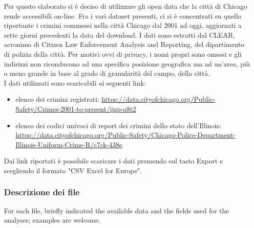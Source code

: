 \documentclass[10pt]{article}
\begin{document}
Per questo elaborato si è deciso di utilizzare gli open data che la città di Chicago rende accessibili on-line. 
Fra i vari dataset presenti, ci si è concentrati su quello riportante i crimini commessi nella città Chicago dal 2001 ad oggi, aggiornati 
a sette giorni precedenti la data del download. I dati sono estratti dal CLEAR, acronimo di Citizen Law Enforcement Analysis and Reporting, 
del dipartimento di polizia della città. Per motivi ovvi di privacy, i nomi propri sono omessi e gli indirizzi non riconducono 
ad una specifica posizione geografica ma ad un'area, più o meno grande in base al grado di granularità del campo, della città. \\
I dati utilizzati sono scaricabili ai seguenti link:
\begin{itemize}
\item elenco dei crimini registrati: \url{https://data.cityofchicago.org/Public-Safety/Crimes-2001-to-present/ijzp-q8t2}
\item elenco dei codici univoci di report dei crimini dello stato dell'Illinois: \url{https://data.cityofchicago.org/Public-Safety/Chicago-Police-Department-Illinois-Uniform-Crime-R/c7ck-438e} 
\end{itemize}
Dai link riportati è possibile scaricare i dati premendo sul tasto Export e scegliendo il formato "CSV Excel for Europe".
 
\subsubsection{Descrizione dei file}

For each file, briefly indicated the available data and the fields used for the analyses; examples are welcome.
\end{document}
